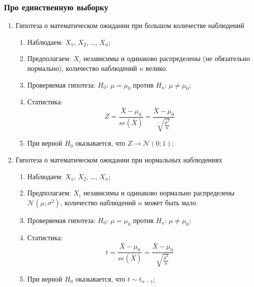 \documentclass[12pt, a4paper]{article}
\newcommand{\cN}{\mathcal{N}}
\begin{document}
\subsubsection{Про единственную выборку}

\begin{enumerate}

  \item Гипотеза о математическом ожидании при большом количестве наблюдений
    \begin{enumerate}

      \item Наблюдаем: $X_1$, $X_2$, \ldots, $X_n$;

      \item Предполагаем: $X_i$ независимы и одинаково распределены (не обязательно нормально), количество наблюдений $n$ велико.

      \item Проверяемая гипотеза: $H_0$: $\mu = \mu_0$ против $H_a$: $\mu \neq \mu_0$;

      \item Статистика:
	\[
	  Z = \frac{\bar X - \mu_0}{se(\bar X)} = \frac{\bar X - \mu_0}{\sqrt{\frac{\hat \sigma^2}{n}}}
	\]

      \item При верной $H_0$ оказывается, что $Z \to \cN(0;1)$;
    \end{enumerate}

  \item Гипотеза о математическом ожидании при нормальных наблюдениях
    \begin{enumerate}

      \item Наблюдаем: $X_1$, $X_2$, \ldots, $X_n$;

      \item Предполагаем: $X_i$ независимы и одинаково нормально распределены $\cN(\mu; \sigma^2)$, количество наблюдений $n$ может быть мало.

      \item Проверяемая гипотеза: $H_0$: $\mu = \mu_0$ против $H_a$: $\mu \neq \mu_0$;

      \item Статистика:
	\[
	  t = \frac{\bar X - \mu_0}{se(\bar X)} = \frac{\bar X - \mu_0}{\sqrt{\frac{\hat \sigma^2}{n}}}
	\]

      \item При верной $H_0$ оказывается, что $t \sim t_{n-1}$;
    \end{enumerate}



\end{enumerate}
\end{document}
